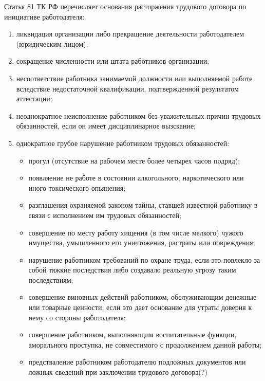 Статья 81 ТК РФ перечисляет основания расторжения трудового договора по инициативе работодателя:
\begin{enumerate}
	\item ликвидация организации либо прекращение деятельности работодателем (юридическим лицом);
	\item сокращение численности или штата работников организации;
	\item несоответствие работника занимаемой должности или выполняемой работе вследствие недостаточной квалификации, подтвержденной результатом аттестации;
	\item неоднократное неисполнение работником без уважительных причин трудовых обязанностей, если он имеет дисциплинарное вызскание;
	\item однократное грубое нарушение работником трудовых обязанностей:
	\begin{itemize}
		\item прогул (отсутствие на рабочем месте более четырех часов подряд);
		\item появляение не работе в состоянии алкогольного, наркотического или иного токсического опьянения;
		\item разглашения охраняемой законом тайны, ставшей известной работнику в связи с исполнением им трудовых обязанностей;
		\item совершение по месту работу хищения (в том числе мелкого) чужого имущества, умышленного его уничтожения, растраты или повреждения;
		\item нарушение работником требований по охране труда, если это повлекло за собой тяжкие последствия либо создавало реальную угрозу таким последствиям;
		\item совершение виновных действий работником, обслуживающим денежные или товарные ценности, если это дает основание для утраты доверия к нему со стороны работодателя;
		\item совершение работником, выполняющим воспитательные функции, аморального проступка, не совместимого с продолжением данной работы;
		\item предстваление работником работодателю подложных документов или ложных сведений при заключении трудового договора(?) 
	\end{itemize} 
\end{enumerate}

